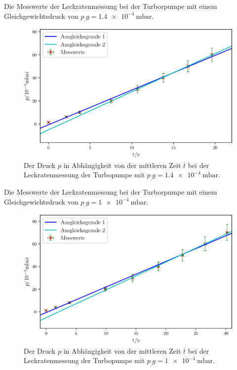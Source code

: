 \newpage
\begin{table}
\centering
\caption{Die Messwerte der Leckratenmessung bei der Turborpumpe mit einem Gleichgewichtsdruck von $p_.g = \SI{1.4e-4}{\milli\bar}$.}

\label{tab:TL2}
\end{table}

\begin{figure}
\centering
\includegraphics[width=\linewidth-70pt,height=\textheight-70pt,keepaspectratio]{content/images/TL2.png}
\caption{Der Druck $p$ in Abhängigkeit von der mittleren Zeit $\bar{t}$ bei der Leckratenmessung der Turbopumpe  mit $p_.g = \SI{1.4e-4}{\milli\bar}$.}
\label{fig:TL2}
\end{figure}

\newpage
\begin{table}
\centering
\caption{Die Messwerte der Leckratenmessung bei der Turborpumpe mit einem Gleichgewichtsdruck von $p_.g = \SI{1e-4}{\milli\bar}$.}

\label{tab:TL3}
\end{table}

\begin{figure}
\centering
\includegraphics[width=\linewidth-70pt,height=\textheight-70pt,keepaspectratio]{content/images/TL3.png}
\caption{Der Druck $p$ in Abhängigkeit von der mittleren Zeit $\bar{t}$ bei der Leckratenmessung der Turbopumpe  mit $p_.g = \SI{1e-4}{\milli\bar}$.}
\label{fig:TL3}
\end{figure}

